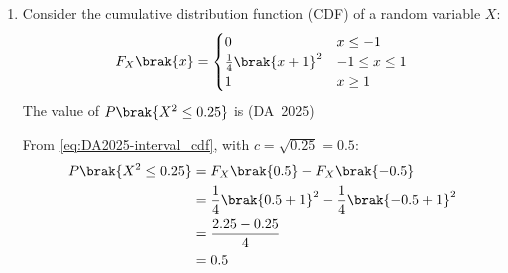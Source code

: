 \begin{enumerate}[label=\thesubsection.\arabic*, ref=\thesubsection.\theenumi]
\begin{itemize}
	\item Eigenvalues and Invertibility: Let $\lambda$ be an eigenvalue of $\vec{A}$ with corresponding eigenvector $\vec{v} \neq \vec{0}$:
	\begin{align}
		\vec{A}\vec{v} = \lambda \vec{v} \implies \vec{v}^{\top}\vec{A}\vec{v} = \lambda \norm{\vec{v}}^2
	\end{align}
	Since $\vec{v} \neq \vec{0}$, $\norm{\vec{v}}^2 > 0$. Together with $\vec{v}^{\top}\vec{A}\vec{v} > 0$, this yields:
	\begin{align}
		\lambda = \frac{\vec{v}^{\top}\vec{A}\vec{v}}{\norm{\vec{v}}^2} > 0
	\end{align}
	Because every eigenvalue $\lambda_i > 0$, zero is not an eigenvalue of $\vec{A}$. Hence, the null space is trivial, which proves that $\vec{A}$ has full rank $n$ and is invertible.
	
	\item Singular Values: Because $\vec{A}$ is real, symmetric, and positive definite, its singular values coincide directly with its eigenvalues:
	\begin{align}
		\sigma_i = \sqrt{\lambda_i\brak{\vec{A}^{\top}\vec{A}}} = \sqrt{\lambda_i^2} = \lambda_i > 0, \quad \forall i \in \{1, \dots, n\}
	\end{align}
	Because all singular values are strictly positive, $0$ cannot be a singular value of $\vec{A}$.
\end{itemize}
	\item 
	Consider the cumulative distribution function (CDF) of a random variable $X$:
	\begin{align}
		F_X\brak{x} = \begin{cases}
			0 & x \le -1 \\
			\frac{1}{4}\brak{x + 1}^2 & -1 \le x \le 1 \\
			1 & x \ge 1
		\end{cases}
	\end{align}
	The value of $P\brak{X^2 \le 0.25}$ is
	\hfill (DA~2025)
	\begin{enumerate}
	\end{enumerate}
	\solution
	From \eqref{eq:DA2025-interval_cdf}, with $c = \sqrt{0.25} = 0.5$:
	\begin{align}
		P\brak{X^2 \le 0.25} &= F_X\brak{0.5} - F_X\brak{-0.5}
		\\
		&= \frac{1}{4}\brak{0.5 + 1}^2 - \frac{1}{4}\brak{-0.5 + 1}^2
		\\
		&= \frac{2.25 - 0.25}{4}
		\\
		&= 0.5
	\end{align}
	

\end{enumerate}
